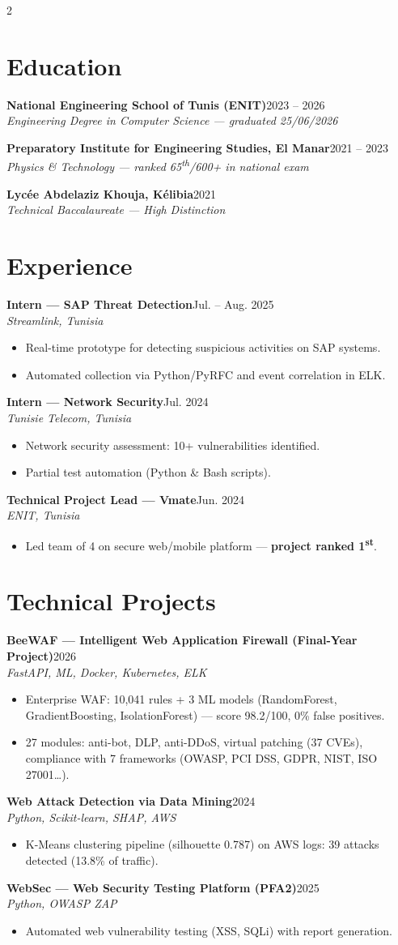 \documentclass[a4paper,10pt]{article}
\newcommand{\role}[3]{%
  {\bfseries #1}\hfill{\small\color{graytext}#2}\\[1pt]
  {\itshape\small\color{accentlight}#3}\par\vspace{2pt}}
\begin{document}
\begin{paracol}{2}
\section{Education}
\role{National Engineering School of Tunis (ENIT)}{2023 -- 2026}{Engineering Degree in Computer Science — graduated 25/06/2026}
\role{Preparatory Institute for Engineering Studies, El Manar}{2021 -- 2023}{Physics \& Technology — ranked 65\textsuperscript{th}/600+ in national exam}
\role{Lycée Abdelaziz Khouja, Kélibia}{2021}{Technical Baccalaureate — High Distinction}
\section{Experience}
\role{Intern — SAP Threat Detection}{Jul. -- Aug. 2025}{Streamlink, Tunisia}
\begin{itemize}
  \item Real-time prototype for detecting suspicious activities on SAP systems.
  \item Automated collection via Python/PyRFC and event correlation in ELK.
\end{itemize}
\role{Intern — Network Security}{Jul. 2024}{Tunisie Telecom, Tunisia}
\begin{itemize}
  \item Network security assessment: 10+ vulnerabilities identified.
  \item Partial test automation (Python \& Bash scripts).
\end{itemize}
\role{Technical Project Lead — Vmate}{Jun. 2024}{ENIT, Tunisia}
\begin{itemize}
  \item Led team of 4 on secure web/mobile platform — \textbf{project ranked 1\textsuperscript{st}}.
\end{itemize}
\section{Technical Projects}
\role{BeeWAF — Intelligent Web Application Firewall (Final-Year Project)}{2026}{FastAPI, ML, Docker, Kubernetes, ELK}
\begin{itemize}
  \item Enterprise WAF: 10,041 rules + 3 ML models (RandomForest, GradientBoosting, IsolationForest) — score 98.2/100, 0\% false positives.
  \item 27 modules: anti-bot, DLP, anti-DDoS, virtual patching (37 CVEs), compliance with 7 frameworks (OWASP, PCI DSS, GDPR, NIST, ISO 27001\dots).
\end{itemize}
\role{Web Attack Detection via Data Mining}{2024}{Python, Scikit-learn, SHAP, AWS}
\begin{itemize}
  \item K-Means clustering pipeline (silhouette 0.787) on AWS logs: 39 attacks detected (13.8\% of traffic).
\end{itemize}
\role{WebSec — Web Security Testing Platform (PFA2)}{2025}{Python, OWASP ZAP}
\begin{itemize}
  \item Automated web vulnerability testing (XSS, SQLi) with report generation.
\end{itemize}
\end{paracol}
\end{document}
